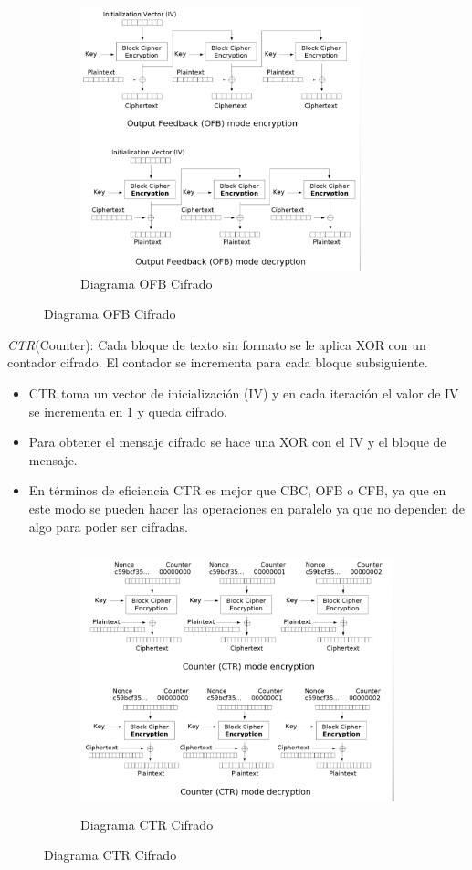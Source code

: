 \begin{figure}[h]
    \centering
    \begin{subfigure}[t]{0.5\textwidth}
        \centering
        \includegraphics[height=3in]{./images/OFB.png}
        \caption{Diagrama OFB Cifrado}
        \label{fig:1-3-1}
    \end{subfigure}
\end{figure}
\pagebreak

\textit{CTR}(Counter): Cada bloque de texto sin formato se le aplica XOR con un contador cifrado. El contador se incrementa para cada bloque subsiguiente.\\
\begin{itemize}
	\item CTR toma un vector de inicialización (IV) y en cada iteración el valor de IV se incrementa en 1 y queda cifrado.
	\item Para obtener el mensaje cifrado se hace una XOR con el IV y el bloque de mensaje.
	\item En términos de eficiencia CTR es mejor que CBC, OFB o CFB, ya que en este modo se pueden hacer las operaciones en paralelo ya que no dependen de algo para poder ser cifradas.
\end{itemize}

\begin{figure}[h]
    \centering
    \begin{subfigure}[t]{0.5\textwidth}
        \centering
        \includegraphics[height=3in]{./images/CTR.png}
        \caption{Diagrama CTR Cifrado}
        \label{fig:1-3-1}
    \end{subfigure}
\end{figure}


